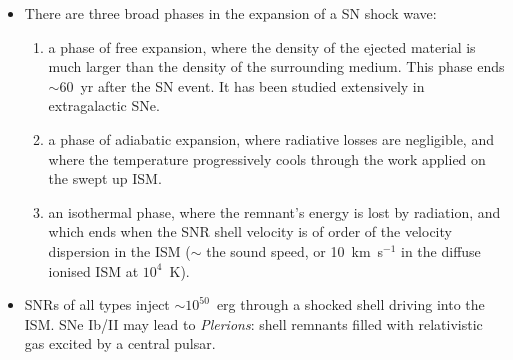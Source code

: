 \begin{itemize}

\item There are three broad phases in the expansion of a SN shock
  wave:

\begin{enumerate}
\item a phase of free expansion, where the density of the ejected
  material is much larger than the density of the surrounding
  medium. This phase ends $\sim$60~yr after the SN event. It has been
  studied extensively in extragalactic SNe.

\item a phase of adiabatic expansion, where radiative losses are
  negligible, and where the temperature progressively cools through
  the work applied on the swept up ISM. 

\item an isothermal phase, where the remnant's energy is lost by
  radiation, and which ends when the SNR shell velocity is of order of
  the velocity dispersion in the ISM ($\sim$ the sound speed, or
  10~km~s$^{-1}$ in the diffuse ionised ISM at $10^4$~K).  

\end{enumerate}


\item SNRs of all types inject $\sim 10^{50}$~erg through a shocked
  shell driving into the ISM. SNe Ib/II may lead to {\em Plerions}:
 shell remnants filled with relativistic gas excited by a central
 pulsar. 

\end{itemize}




